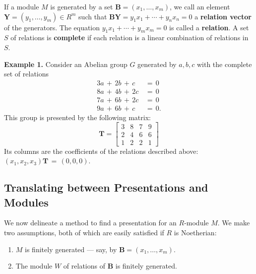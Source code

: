 \documentclass[11pt]{article}
\renewcommand{\vec}[1]{\mathbf{#1}}
\newcommand{\mat}[1]{\mathbf{#1}}
\begin{document}
If a module $M$ is generated by a set $\vec{B} = (x_{1}, \ldots, x_{m})$, we call an element $\vec{Y} = (y_{1}, \ldots, y_{m}) \in R^{m}$ such that $\vec{BY} = y_{1}x_{1} + \cdots + y_{n}x_{n} = 0$ a \textbf{relation vector} of the generators. The equation $y_{1}x_{1} + \cdots + y_{m}x_{m} = 0$ is called a \textbf{relation}. A set $S$ of relations is \textbf{complete} if each relation is a linear combination of relations in $S$.

\textbf{Example 1.} Consider an Abelian group $G$ generated by $a, b, c$ with the complete set of relations
\begin{align*}
  3a \, + \, 2b \, + \, c &= \, 0 \\
  8a \, + \, 4b \, + \, 2c \, &= \, 0 \\
  7a \, + \, 6b \, + \, 2c \, &= \, 0 \\
  9a \, + \, 6b \, + \, c \, &= \, 0.
\end{align*}
This group is presented by the following matrix:
\[
  \mat{T} = \begin{bmatrix} 3 & 8 & 7 & 9 \\ 2 & 4 & 6 & 6 \\ 1 & 2 & 2 & 1 \end{bmatrix}
\]
Its columns are the coefficients of the relations described above: $(x_{1}, x_{2}, x_{3}) \mat{T} \, = \, (0, 0, 0)$.

\subsection{Translating between Presentations and Modules}

We now delineate a method to find a presentation for an $R$-module $M$. We make two assumptions, both of which are easily satisfied if $R$ is Noetherian:
\begin{enumerate}
  \item $M$ is finitely generated --- say, by $\vec{B} = (x_{1}, \ldots, x_{m})$.
  \item The module $W$ of relations of $\vec{B}$ is finitely generated.
\end{enumerate}
\end{document}
